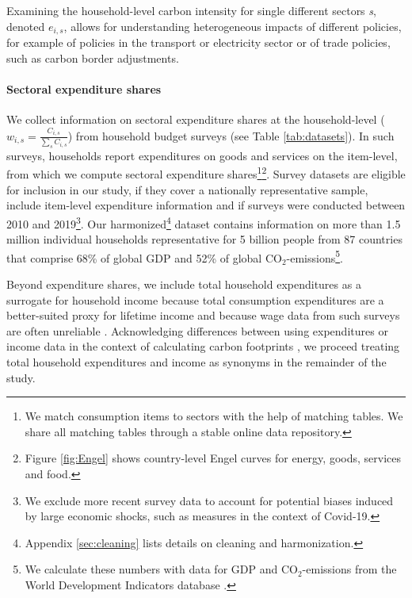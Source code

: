 \documentclass[12pt, a4paper]{article}
\begin{document}
Examining the household-level carbon intensity for single different sectors \textit{s}, denoted $e_{i,s}$, allows for understanding heterogeneous impacts of different policies, for example of policies in the transport or electricity sector or of trade policies, such as carbon border adjustments.

\paragraph{Sectoral expenditure shares} We collect information on sectoral expenditure shares at the household-level ($w_{i,s}=\frac{C_{i,s}}{\sum_{s}C_{i,s}}$) from household budget surveys (see Table \ref{tab:datasets}). In such surveys, households report expenditures on goods and services on the item-level, from which we compute sectoral expenditure shares\footnote{We match consumption items to sectors with the help of matching tables. We share all matching tables through a stable online data repository.}\footnote{Figure \ref{fig:Engel} shows country-level Engel curves for energy, goods, services and food.}.
Survey datasets are eligible for inclusion in our study, if they cover a nationally representative sample, include item-level expenditure information and if surveys were conducted between 2010 and 2019\footnote{We exclude more recent survey data to account for potential biases induced by large economic shocks, such as measures in the context of Covid-19.}. Our harmonized\footnote{Appendix \ref{sec:cleaning} lists details on cleaning and harmonization.} dataset contains information on more than 1.5 million individual households representative for 5 billion people from 87 countries that comprise 68\% of global GDP and 52\% of global CO$_{2}$-emissions\footnote{We calculate these numbers with data for GDP and CO$_{2}$-emissions from the World Development Indicators database \autocite{WorldBankGroup.2023}.}.

Beyond expenditure shares, we include total household expenditures as a surrogate for household income because total consumption expenditures are a better-suited proxy for lifetime income \autocite{Poterba.1989,Poterba.1991,Cronin.2019} and because wage data from such surveys are often unreliable \autocite{Blundell.1998}. Acknowledging differences between using expenditures or income data in the context of calculating carbon footprints \autocite{Levay.2023}, we proceed treating total household expenditures and income as synonyms in the remainder of the study.
\end{document}
